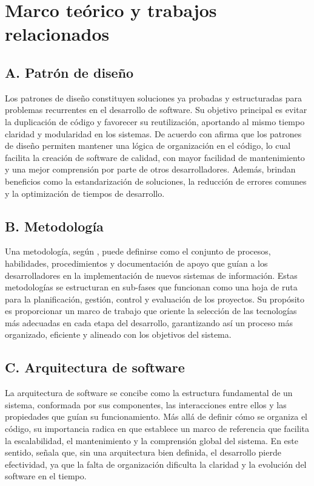 \section{Marco teórico y trabajos relacionados}
\subsection{A. Patrón de diseño}
Los patrones de diseño constituyen soluciones ya probadas y estructuradas para problemas recurrentes en el desarrollo de software. Su objetivo principal es evitar la duplicación de código y favorecer su reutilización, aportando al mismo tiempo claridad y modularidad en los sistemas. De acuerdo con \cite{gavilanez2022analisis} afirma que los patrones de diseño permiten mantener una lógica de organización en el código, lo cual facilita la creación de software de calidad, con mayor facilidad de mantenimiento y una mejor comprensión por parte de otros desarrolladores. Además, brindan beneficios como la estandarización de soluciones, la reducción de errores comunes y la optimización de tiempos de desarrollo.

\subsection{B. Metodología}
Una metodología, según \cite{merchan2022comparacion}, puede definirse como el conjunto de procesos, habilidades, procedimientos y documentación de apoyo que guían a los desarrolladores en la implementación de nuevos sistemas de información. Estas metodologías se estructuran en sub-fases que funcionan como una hoja de ruta para la planificación, gestión, control y evaluación de los proyectos. Su propósito es proporcionar un marco de trabajo que oriente la selección de las tecnologías más adecuadas en cada etapa del desarrollo, garantizando así un proceso más organizado, eficiente y alineado con los objetivos del sistema.

\subsection{C. Arquitectura de software}
La arquitectura de software se concibe como la estructura fundamental de un sistema, conformada por sus componentes, las interacciones entre ellos y las propiedades que guían su funcionamiento. Más allá de definir cómo se organiza el código, su importancia radica en que establece un marco de referencia que facilita la escalabilidad, el mantenimiento y la comprensión global del sistema. En este sentido, \cite{vera2022arquitectura} señala que, sin una arquitectura bien definida, el desarrollo pierde efectividad, ya que la falta de organización dificulta la claridad y la evolución del software en el tiempo.

